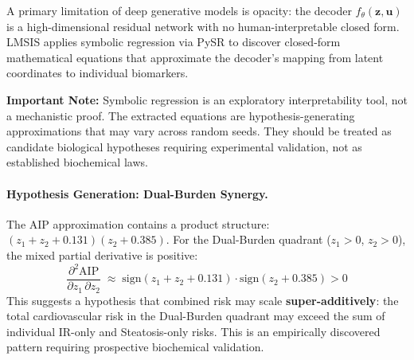\documentclass[12pt,a4paper,oneside]{report}
\begin{document}
A primary limitation of deep generative models is opacity: the decoder $f_\theta(\mathbf{z},\mathbf{u})$ is a high-dimensional residual network with no human-interpretable closed form. LMSIS applies symbolic regression via PySR to discover closed-form mathematical equations that approximate the decoder's mapping from latent coordinates to individual biomarkers.

\textbf{Important Note:} Symbolic regression is an exploratory interpretability tool, not a mechanistic proof. The extracted equations are hypothesis-generating approximations that may vary across random seeds. They should be treated as candidate biological hypotheses requiring experimental validation, not as established biochemical laws.

\begin{table}[H]
\centering
\caption{Symbolic regression discoveries (hypothesis-grade).}
\label{tab:symbolic}
\end{table}

\paragraph{Hypothesis Generation: Dual-Burden Synergy.} The AIP approximation contains a product structure: $(z_1 + z_2 + 0.131)(z_2 + 0.385)$. For the Dual-Burden quadrant ($z_1 > 0$, $z_2 > 0$), the mixed partial derivative is positive:
\[
\frac{\partial^2 \text{AIP}}{\partial z_1\, \partial z_2} \;\approx\; \mathrm{sign}(z_1 + z_2 + 0.131) \cdot \mathrm{sign}(z_2 + 0.385) > 0
\]
This suggests a hypothesis that combined risk may scale \textbf{super-additively}: the total cardiovascular risk in the Dual-Burden quadrant may exceed the sum of individual IR-only and Steatosis-only risks. This is an empirically discovered pattern requiring prospective biochemical validation.
\end{document}
